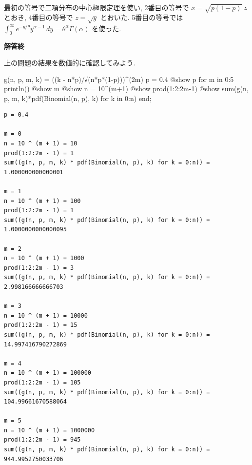 \documentclass[
  letterpaper,
  DIV=11,
  numbers=noendperiod]{scrartcl}
\newenvironment{Shaded}{\begin{snugshade}}{\end{snugshade}}
\newcommand{\ControlFlowTok}[1]{\textcolor[rgb]{0.00,0.23,0.31}{#1}}
\newcommand{\FloatTok}[1]{\textcolor[rgb]{0.68,0.00,0.00}{#1}}
\newcommand{\FunctionTok}[1]{\textcolor[rgb]{0.28,0.35,0.67}{#1}}
\newcommand{\KeywordTok}[1]{\textcolor[rgb]{0.00,0.23,0.31}{#1}}
\newcommand{\NormalTok}[1]{\textcolor[rgb]{0.00,0.23,0.31}{#1}}
\newcommand{\OperatorTok}[1]{\textcolor[rgb]{0.37,0.37,0.37}{#1}}
\newcommand{\PreprocessorTok}[1]{\textcolor[rgb]{0.68,0.00,0.00}{#1}}
\begin{document}
最初の等号で二項分布の中心極限定理を使い, 2番目の等号で
\(x = \sqrt{p(1-p)}\;z\) とおき, 4番目の等号で \(z = \sqrt{y}\)
とおいた. 5番目の等号では
\(\int_0^\infty e^{-y/\theta}y^{\alpha-1}\,dy = \theta^\alpha\Gamma(\alpha)\)
を使った.

\textbf{解答終}

上の問題の結果を数値的に確認してみよう.

\begin{Shaded}
\begin{Highlighting}[]
\FunctionTok{g}\NormalTok{(n, p, m, k) }\OperatorTok{=}\NormalTok{ ((k }\OperatorTok{{-}}\NormalTok{ n}\OperatorTok{*}\NormalTok{p)}\OperatorTok{/}\FunctionTok{√}\NormalTok{(}\FunctionTok{n*p*}\NormalTok{(}\FloatTok{1}\OperatorTok{{-}}\NormalTok{p)))}\OperatorTok{\^{}}\NormalTok{(}\FloatTok{2}\NormalTok{m)}
\NormalTok{p }\OperatorTok{=} \FloatTok{0.4}
\PreprocessorTok{@show}\NormalTok{ p}
\ControlFlowTok{for}\NormalTok{ m }\KeywordTok{in} \FloatTok{0}\OperatorTok{:}\FloatTok{5}
    \FunctionTok{println}\NormalTok{()}
    \PreprocessorTok{@show}\NormalTok{ m}
    \PreprocessorTok{@show}\NormalTok{ n }\OperatorTok{=} \FloatTok{10}\OperatorTok{\^{}}\NormalTok{(m}\OperatorTok{+}\FloatTok{1}\NormalTok{)}
    \PreprocessorTok{@show} \FunctionTok{prod}\NormalTok{(}\FloatTok{1}\OperatorTok{:}\FloatTok{2}\OperatorTok{:}\FloatTok{2}\NormalTok{m}\OperatorTok{{-}}\FloatTok{1}\NormalTok{)}
    \PreprocessorTok{@show} \FunctionTok{sum}\NormalTok{(}\FunctionTok{g}\NormalTok{(n, p, m, k)}\FunctionTok{*pdf}\NormalTok{(}\FunctionTok{Binomial}\NormalTok{(n, p), k) }\ControlFlowTok{for}\NormalTok{ k }\KeywordTok{in} \FloatTok{0}\OperatorTok{:}\NormalTok{n)}
\ControlFlowTok{end}\NormalTok{;}
\end{Highlighting}
\end{Shaded}

\begin{verbatim}
p = 0.4

m = 0
n = 10 ^ (m + 1) = 10
prod(1:2:2m - 1) = 1
sum((g(n, p, m, k) * pdf(Binomial(n, p), k) for k = 0:n)) = 1.000000000000001

m = 1
n = 10 ^ (m + 1) = 100
prod(1:2:2m - 1) = 1
sum((g(n, p, m, k) * pdf(Binomial(n, p), k) for k = 0:n)) = 1.0000000000000095

m = 2
n = 10 ^ (m + 1) = 1000
prod(1:2:2m - 1) = 3
sum((g(n, p, m, k) * pdf(Binomial(n, p), k) for k = 0:n)) = 2.998166666666703

m = 3
n = 10 ^ (m + 1) = 10000
prod(1:2:2m - 1) = 15
sum((g(n, p, m, k) * pdf(Binomial(n, p), k) for k = 0:n)) = 14.997416790272869

m = 4
n = 10 ^ (m + 1) = 100000
prod(1:2:2m - 1) = 105
sum((g(n, p, m, k) * pdf(Binomial(n, p), k) for k = 0:n)) = 104.99661670588064

m = 5
n = 10 ^ (m + 1) = 1000000
prod(1:2:2m - 1) = 945
sum((g(n, p, m, k) * pdf(Binomial(n, p), k) for k = 0:n)) = 944.9952750033706
\end{verbatim}
\end{document}
